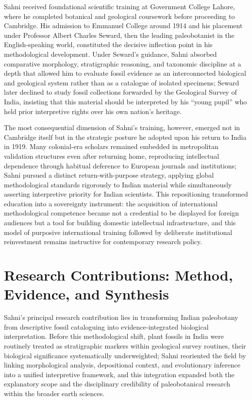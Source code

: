 \documentclass[10pt]{article}
\begin{document}
Sahni received foundational scientific training at Government College Lahore, where he completed botanical and geological coursework before proceeding to Cambridge.\cite{from_lahore_lucknow} His admission to Emmanuel College around 1914 and his placement under Professor Albert Charles Seward, then the leading paleobotanist in the English-speaking world, constituted the decisive inflection point in his methodological development. Under Seward's guidance, Sahni absorbed comparative morphology, stratigraphic reasoning, and taxonomic discipline at a depth that allowed him to evaluate fossil evidence as an interconnected biological and geological system rather than as a catalogue of isolated specimens; Seward later declined to study fossil collections forwarded by the Geological Survey of India, insisting that this material should be interpreted by his ``young pupil'' who held prior interpretive rights over his own nation's heritage.\cite{from_lahore_lucknow}

The most consequential dimension of Sahni's training, however, emerged not in Cambridge itself but in the strategic posture he adopted upon his return to India in 1919.\cite{wiki_birbal} Many colonial-era scholars remained embedded in metropolitan validation structures even after returning home, reproducing intellectual dependence through habitual deference to European journals and institutions; Sahni pursued a distinct return-with-purpose strategy, applying global methodological standards rigorously to Indian material while simultaneously asserting interpretive priority for Indian scientists.\cite{science_state_nation} This repositioning transformed education into a sovereignty instrument: the acquisition of international methodological competence became not a credential to be displayed for foreign audiences but a tool for building domestic intellectual infrastructure, and this model of purposive international training followed by deliberate institutional reinvestment remains instructive for contemporary research policy.\cite{from_lahore_lucknow}


\section*{Research Contributions: Method, Evidence, and Synthesis}

Sahni's principal research contribution lies in transforming Indian paleobotany from descriptive fossil cataloguing into evidence-integrated biological interpretation. Before this methodological shift, plant fossils in India were routinely treated as stratigraphic markers within geological survey routines, their biological significance systematically underweighted; Sahni reoriented the field by linking morphological analysis, depositional context, and evolutionary inference into a unified interpretive framework, and this integration expanded both the explanatory scope and the disciplinary credibility of paleobotanical research within the broader earth sciences.\cite{palaeobot_bio}
\end{document}
